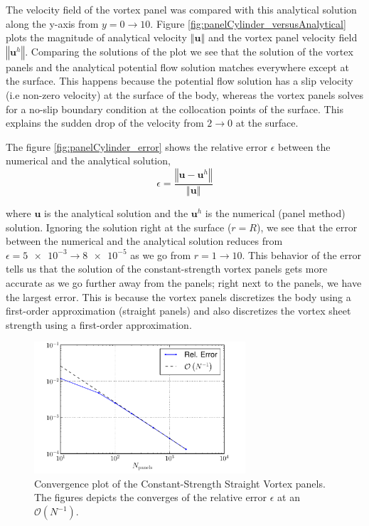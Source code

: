 The velocity field of the vortex panel was compared with this analytical solution along the y-axis from $y=0 \rightarrow 10$. Figure \ref{fig:panelCylinder_versusAnalytical} plots the magnitude of analytical velocity $\left\Vert\mathbf{u}\right\Vert$ and the vortex panel velocity field $\left\Vert\mathbf{u}^h\right\Vert$. Comparing the solutions of the plot we see that the solution of the vortex panels and the analytical potential flow solution matches everywhere except at the surface. This happens because the potential flow solution has a slip velocity (i.e non-zero velocity) at the surface of the body, whereas the vortex panels solves for a no-slip boundary condition at the collocation points of the surface. This explains the sudden drop of the velocity from $2\rightarrow0$ at the surface.	

The figure \ref{fig:panelCylinder_error} shows the relative error $\epsilon$ between the numerical and the analytical solution,
	\begin{equation}
	\epsilon = \frac{\left\Vert\mathbf{u}-\mathbf{u}^h\right\Vert}{\left\Vert\mathbf{u}\right\Vert}
	\label{eq:panelRelativeError}
	\end{equation}
	
where $\mathbf{u}$ is the analytical solution and the $\mathbf{u}^h$ is the numerical (panel method) solution. Ignoring the solution right at the surface ($r=R$), we see that the error between the numerical and the analytical solution reduces from $\epsilon=\num{5e-3}\rightarrow \num{8e-5}$ as we go from $r=1\rightarrow10$. This behavior of the error tells us that the solution of the constant-strength vortex panels gets more accurate as we go further away from the panels; right next to the panels, we have the largest error. This is because the vortex panels discretizes the body using a first-order approximation (straight panels) and also discretizes the vortex sheet strength using a first-order approximation. 

	\begin{figure}[!t]
	\centering
	\includegraphics[width=0.7\textwidth]{figures/lagrangian/panelCylinder_convergence_compressed.pdf}
	\caption{Convergence plot of the Constant-Strength Straight Vortex panels. The figures depicts the converges of the relative error $\epsilon$ at an $\mathcal{O}\left(N^{-1}\right)$.}
	\label{fig:panelCylinder_convergence}
	\end{figure}

